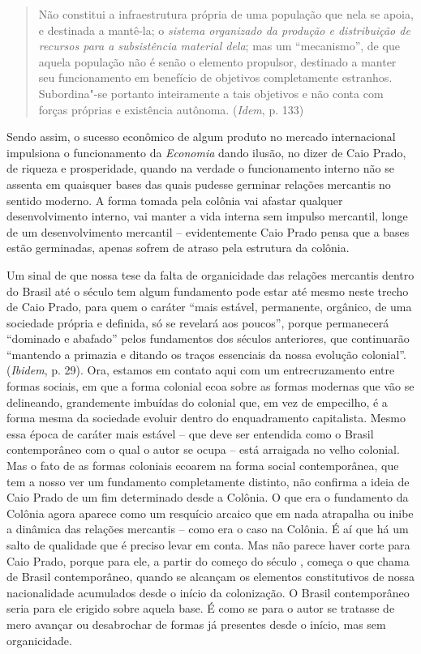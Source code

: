 \begin{quote}
Não constitui a infraestrutura própria de uma população que nela se
apoia, e destinada a mantê-la; o \emph{sistema organizado da produção e
distribuição de recursos para a subsistência material dela}; mas um
``mecanismo'', de que aquela população não é senão o elemento propulsor,
destinado a manter seu funcionamento em benefício de objetivos
completamente estranhos. Subordina"-se portanto inteiramente a tais
objetivos e não conta com forças próprias e existência autônoma.
(\emph{Idem}, p. 133)
\end{quote}

Sendo assim, o sucesso econômico de algum produto no mercado
internacional impulsiona o funcionamento da \emph{Economia} dando
ilusão, no dizer de Caio Prado, de riqueza e prosperidade, quando na
verdade o funcionamento interno não se assenta em quaisquer bases das
quais pudesse germinar relações mercantis no sentido moderno. A forma
tomada pela colônia vai afastar qualquer desenvolvimento interno, vai
manter a vida interna sem impulso mercantil, longe de um desenvolvimento
mercantil -- evidentemente Caio Prado pensa que a bases estão
germinadas, apenas sofrem de atraso pela estrutura da colônia.

Um sinal de que nossa tese da falta de organicidade das relações
mercantis dentro do Brasil até o século  tem algum fundamento pode
estar até mesmo neste trecho de Caio Prado, para quem o caráter ``mais
estável, permanente, orgânico, de uma sociedade própria e definida, só
se revelará aos poucos'', porque permanecerá ``dominado e abafado''
pelos fundamentos dos séculos anteriores, que continuarão ``mantendo a
primazia e ditando os traços essenciais da nossa evolução colonial''.
(\emph{Ibidem}, p. 29). Ora, estamos em contato aqui com um
entrecruzamento entre formas sociais, em que a forma colonial ecoa sobre
as formas modernas que vão se delineando, grandemente imbuídas do
colonial que, em vez de empecilho, é a forma mesma da sociedade evoluir
dentro do enquadramento capitalista. Mesmo essa época de caráter mais
estável -- que deve ser entendida como o Brasil contemporâneo com o qual
o autor se ocupa -- está arraigada no velho colonial. Mas o fato de as
formas coloniais ecoarem na forma social contemporânea, que tem a nosso
ver um fundamento completamente distinto, não confirma a ideia de Caio
Prado de um fim determinado desde a Colônia. O que era o fundamento da
Colônia agora aparece como um resquício arcaico que em nada atrapalha ou
inibe a dinâmica das relações mercantis -- como era o caso na Colônia. É
aí que há um salto de qualidade que é preciso levar em conta. Mas não
parece haver corte para Caio Prado, porque para ele, a partir do começo
do século , começa o que chama de Brasil contemporâneo, quando se
alcançam os elementos constitutivos de nossa nacionalidade acumulados
desde o início da colonização. O Brasil contemporâneo seria para ele
erigido sobre aquela base. É como se para o autor se tratasse de mero
avançar ou desabrochar de formas já presentes desde o início, mas sem
organicidade.

